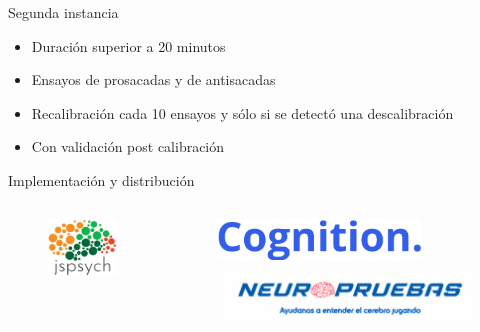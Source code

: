 \documentclass[aspectratio=169]{beamer}
\begin{document}
\begin{frame}{Segunda instancia}
  \begin{itemize}
    \item Duración superior a 20 minutos
    \item Ensayos de prosacadas y de antisacadas
    \item Recalibración cada 10 ensayos y sólo si se detectó una
      descalibración
    \item Con validación post calibración
  \end{itemize}
\end{frame}

\begin{frame}{Implementación y distribución}

  \begin{columns}
    \begin{column}{0.4\textwidth}
      \begin{figure}
        \centering
        \includegraphics[width=\textwidth]{img/jspsych-logo.jpg}
      \end{figure}
    \end{column}
    \begin{column}{0.6\textwidth}
      \begin{figure}
        \centering
        \includegraphics[width=0.8\textwidth]{img/cognition-run-logo.png}
        \includegraphics[width=\textwidth]{img/neuropruebas-logo.jpg}
      \end{figure}
    \end{column}
  \end{columns}
\end{frame}
\end{document}
